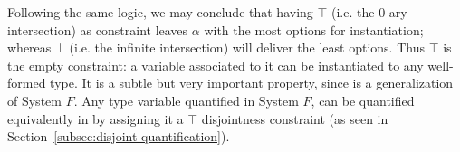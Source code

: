 Following the same logic, we may conclude that having $\top$ (i.e. the 0-ary intersection)
as constraint leaves $\alpha$ with the most options for instantiation; 
whereas $\bot$ (i.e. the infinite intersection) will deliver the least options.
Thus $\top$ is the empty constraint: a variable associated to it can be instantiated to any 
well-formed type.
It is a subtle but very important property, since \name is a generalization of System $F$. 
Any type variable quantified in System $F$, can be quantified equivalently in \name
by assigning it a $\top$ disjointness constraint
(as seen in Section~\ref{subsec:disjoint-quantification}).
\begin{comment}
We will briefly discuss the role of the former in our system. 
\joao{maybe we can just refer to the overview and delete the next
  paragraph?}
\bruno{That could be an idea, yes.}

\paragraph{The most liberal bound.}
It is easy to see that $\top$ is the most liberal type since it is disjoint to everything. 
This means that the $\top$ type actually plays an important role in our system, since the latter 
must be complete with respect to System $F$. 
In other words, any program accepted by System $F$ should also be accepted by \name.
Since System $F$ does not contain disjointness quantification, $\top$ comes in handy:
the System $F$'s type $\forall \alpha. {T_F}$ (where ${T_F}$ is some other type), is
equivalent to \name's type $\fordis \alpha \top {T_i}$, where ${T_i}$ is also an equivalent 
translation of $T_{F}$.
An example of such translation has been given in Section~\ref{sec:overview}.
\end{comment}
